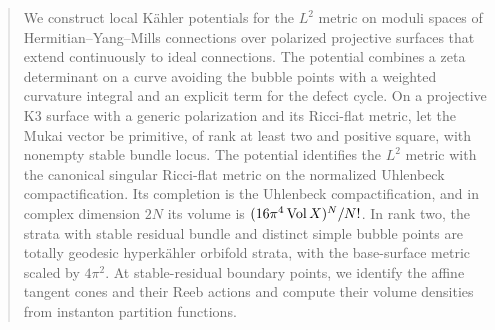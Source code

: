 \begin{abstract}
We construct local K\"ahler potentials for the $L^2$ metric on moduli
spaces of Hermitian--Yang--Mills connections over polarized projective
surfaces that extend continuously to ideal connections.
The potential combines a zeta determinant on a curve avoiding the bubble
points with a weighted curvature integral and an explicit term for the
defect cycle. On a projective K3 surface with a generic polarization and its Ricci-flat
metric, let the Mukai vector be primitive, of rank at least two and
positive square, with nonempty stable bundle locus. The potential identifies the $L^2$ metric with the canonical singular
Ricci-flat metric on the normalized Uhlenbeck compactification.
Its completion is the Uhlenbeck compactification, and in complex
dimension $2N$ its volume is $(16\pi^4\Vol X)^N/N!$.
In rank two, the strata with stable residual bundle and distinct simple
bubble points are totally geodesic hyperk\"ahler orbifold strata, with
the base-surface metric scaled by $4\pi^2$.
At stable-residual boundary points, we identify the affine tangent cones
and their Reeb actions and compute their volume densities from instanton
partition functions.
\end{abstract}
